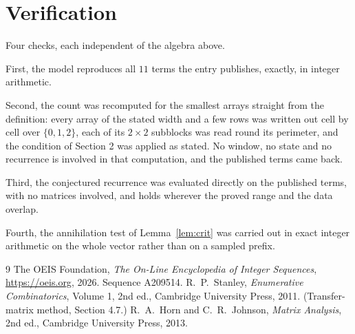 \documentclass[11pt,a4paper]{article}
\theoremstyle{plain}
\theoremstyle{definition}
\begin{document}
\section{Verification}

Four checks, each independent of the algebra above.

First, the model reproduces all $11$ terms the entry publishes, exactly, in integer
arithmetic.

Second, the count was recomputed for the smallest arrays straight from the definition: every
array of the stated width and a few rows was written out cell by cell over $\{0,1,2\}$, each of
its $2\times2$ subblocks was read round its perimeter, and the condition of Section 2 was
applied as stated. No window, no state and no recurrence is involved in that computation, and
the published terms came back.

Third, the conjectured recurrence was evaluated directly on the published terms, with no
matrices involved, and holds wherever the proved range and the data overlap.

Fourth, the annihilation test of Lemma~\ref{lem:crit} was carried out in exact integer
arithmetic on the whole vector rather than on a sampled prefix.

\begin{thebibliography}{9}
 The OEIS Foundation, \emph{The On-Line Encyclopedia of Integer
Sequences}, \url{https://oeis.org}, 2026. Sequence A209514.
 R.~P.~Stanley, \emph{Enumerative Combinatorics}, Volume 1, 2nd ed.,
Cambridge University Press, 2011. (Transfer-matrix method, Section 4.7.)
 R.~A.~Horn and C.~R.~Johnson, \emph{Matrix Analysis}, 2nd ed., Cambridge
University Press, 2013.
\end{thebibliography}
\end{document}
